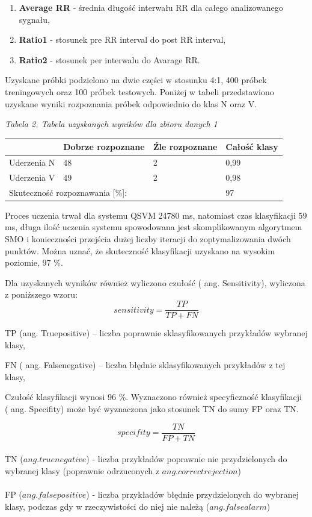 \documentclass[11pt]{article}
\begin{document}
\begin{enumerate}
\begin{enumerate}
\item  \textbf{Average RR} - średnia długość interwału RR dla całego analizowanego sygnału,

\item  \textbf{Ratio1} - stosunek pre RR interval do post RR interval,

\item  \textbf{Ratio2 }- stosunek per interwalu do Avarage RR.
\end{enumerate}

\noindent Uzyskane próbki podzielono na dwie części w stosunku 4:1, 400 próbek treningowych oraz 100 próbek testowych. Poniżej w tabeli przedstawiono uzyskane wyniki rozpoznania próbek odpowiednio do klas N oraz V.

\textit{Tabela 2. Tabela uzyskanych wyników dla zbioru danych 1}
\newline
\begin{tabular}{|p{1.1in}|p{1.1in}|p{1.1in}|p{1.1in}|} \hline 
 & Dobrze rozpoznane & \'{Z}le rozpoznane & Całość klasy  \\ \hline 
Uderzenia N & 48 & 2 & 0,99 \\ \hline 
Uderzenia V & 49 & 2 & 0,98 \\ \hline 
\multicolumn{3}{|p{1in}|}{Skuteczność rozpoznawania [\%]:} & 97 \\ \hline 
\end{tabular}



\noindent Proces uczenia trwał dla systemu QSVM 24780 ms, natomiast czas klasyfikacji 59 ms, długa ilość uczenia systemu spowodowana jest skomplikowanym algorytmem SMO i konieczności przejścia dużej liczby iteracji do zoptymalizowania dwóch punktów. Można uznać, że skuteczność klasyfikacji uzyskano na wysokim poziomie, 97 \%. 

\noindent Dla uzyskanych wyników również wyliczono czułość ( ang. Sensitivity), wyliczona z poniższego wzoru:
 $$
sensitivity = \frac{TP}{TP + FN}
$$

\noindent TP (ang. Truepositive) -- liczba poprawnie sklasyfikowanych przykładów wybranej klasy,

\noindent FN ( ang. Falsenegative) -- liczba błędnie sklasyfikowanych przykładów z tej klasy,

\noindent Czułość klasyfikacji wynosi 96 \%. Wyznaczono również specyficzność klasyfikacji ( ang. Specifity) może być wyznaczona jako stosunek TN do sumy FP oraz TN.

 $$
specifity = \frac{TN}{FP + TN}
$$
\\
TN ($ang. true negative$) - liczba przykładów poprawnie nie przydzielonych do wybranej klasy (poprawnie odrzuconych z $ang. correct rejection$)\\
\\
FP ($ang. false positive$) - liczba przykładów błędnie przydzielonych do wybranej klasy, podczas gdy w rzeczywistości do niej nie należą ($ang. false alarm$)\\


\end{enumerate}
\end{document}
